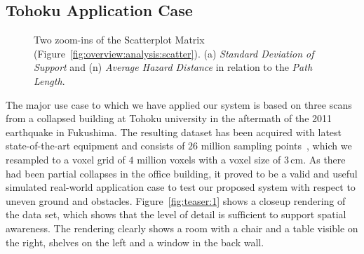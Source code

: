\documentclass[conference,10pt,letter]{IEEEtran}
\begin{document}
\subsection{Tohoku Application Case} \label{sec:results:applicationcase}
\begin{figure}[b]
    \vspace{-0.5cm}
    \centering
    \hspace{0.5cm}
    \caption{Two zoom-ins of the Scatterplot Matrix (Figure~\ref{fig:overview:analysis:scatter}).  (a) \emph{Standard Deviation of Support} and (n) \emph{Average Hazard Distance} in relation to the \emph{Path Length}.}
\end{figure}


The major use case to which we have applied our system is based on three scans from a collapsed building at Tohoku university in the aftermath of the 2011 earthquake in Fukushima. The resulting dataset has been acquired with latest state-of-the-art equipment and consists of $26$ million sampling points~\cite{journals/jfr/NagataniKOOYTNYKFK13}, which we resampled to a voxel grid of $4$ million voxels with a voxel size of 3\,cm. As there had been partial collapses in the office building, it proved to be a valid and useful simulated real-world application case to test our proposed system with respect to uneven ground and obstacles. Figure~\ref{fig:teaser:1} shows a closeup rendering of the data set, which shows that the level of detail is sufficient to support spatial awareness. The rendering clearly shows a room with a chair and a table visible on the right, shelves on the left and a window in the back wall.
\end{document}
